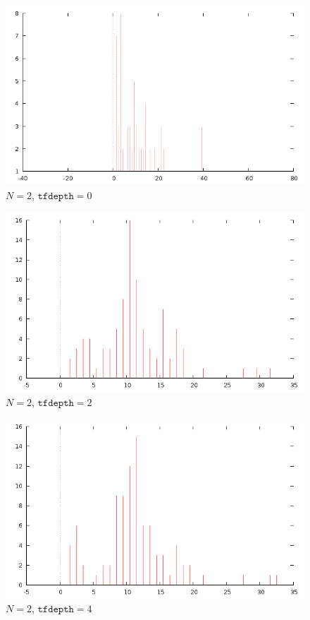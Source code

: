 \documentclass[12pt]{article}
\begin{document}
\begin{figure}[H]
\centering
\caption{$N=2$, $\texttt{tfdepth}=0$}
\includegraphics[scale=0.6]{times2-0.png}
\end{figure} 

\begin{figure}[H]
\centering
\caption{$N=2$, $\texttt{tfdepth}=2$}
\includegraphics[scale=0.6]{times2-2.png}
\end{figure} 

\begin{figure}[H]
\centering
\caption{$N=2$, $\texttt{tfdepth}=4$}
\includegraphics[scale=0.6]{times2-4.png}
\end{figure} 
\end{document}
